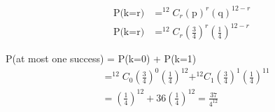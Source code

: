 \documentclass[journal,12pt,twocolumn]{IEEEtran}
\begin{document}
\begin{align}
\text{P(k=r)} &= ^{12}C_r (\text{p})^r (\text{q})^{12-r}\\
\text{P(k=r)} &= ^{12}C_r \left(\frac{3}{4}\right)^r \left(\frac{1}{4}\right)^{12-r}
\end{align}

\begin{center}
\end{center}
P(at most one success) = P(k=0) + P(k=1)
\begin{align}
&= ^{12}C_0 \left({\frac{3}{4}}\right)^0 \left(\frac{1}{4}\right)^{12} + ^{12}C_1 \left(\frac{3}{4}\right)^1 \left(\frac{1}{4}\right)^{11} 
\\
&= \left(\frac{1}{4}\right)^{12} + 36\left(\frac{1}{4}\right)^{12} =  \frac{37}{4^{12}}
\end{align}
\end{document}
